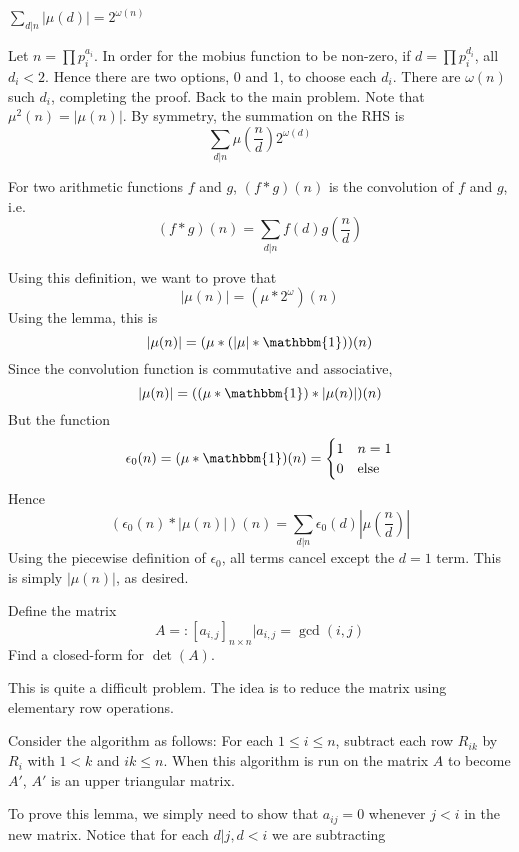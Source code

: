 \documentclass[11pt]{scrartcl}
\begin{document}
\begin{soln}
  \begin{lemma}
    $\sum_{d|n}|\mu(d)|=2^{\omega(n)}$
  \end{lemma}
    Let $n=\prod p_i^{a_i}$. In order for the mobius function to be
    non-zero, if $d=\prod p_i^{d_i}$, all $d_i<2$. Hence there are two options,
    0 and 1, to choose each $d_i$. There are $\omega(n)$ such $d_i$, completing
    the proof.
  \newline \newline
  Back to the main problem. Note that $\mu^2(n)=|\mu(n)|$.
  By symmetry, the summation on the RHS is
  $$\sum_{d|n}\mu\left(\frac{n}{d}\right)2^{\omega(d)}$$
  \begin{definition}
    For two arithmetic functions $f$ and $g$, $(f*g)(n)$ is the convolution
    of $f$ and $g$, i.e.
    $$(f*g)(n)=\sum_{d|n}f(d)g\left(\frac{n}{d}\right)$$
  \end{definition}
  \noindent Using this definition, we want to prove that
  $$|\mu(n)|=(\mu * 2^{\omega})(n)$$
  Using the lemma, this is
  $$|\mu(n)|=(\mu * (|\mu|*\mathbbm{1}))(n)$$
  Since the convolution function is commutative and associative,
  $$|\mu(n)|=((\mu*\mathbbm{1})*|\mu(n)|)(n)$$
  But the function
  $$\epsilon_0(n)=(\mu*\mathbbm{1})(n)=\begin{cases}1 & n=1 \\ 0 & \mathrm{else}\end{cases}$$
  Hence
  $$(\epsilon_0(n)*|\mu(n)|)(n)=\sum_{d|n}\epsilon_0(d)|\mu\left(\frac{n}{d}\right)|$$
  Using the piecewise definition of $\epsilon_0$, all terms cancel except the $d=1$ term.
  This is simply $|\mu(n)|$, as desired.
\end{soln}
\begin{example}
  Define the matrix
  $$A=:[a_{i,j}]_{n\times n}|a_{i,j}=\gcd(i,j)$$
  Find a closed-form for $\det(A)$.
\end{example}
 This is quite a difficult problem. The idea is to reduce the matrix using elementary row operations.
 \begin{lemma}
   Consider the algorithm as follows: For each $1\le i\le n$, subtract each row $R_{ik}$ by $R_i$ with $1<k$ and $ik\le n$.
   When this algorithm is run on the matrix $A$ to become $A'$, $A'$ is an upper triangular matrix.
 \end{lemma}
 To prove this lemma, we simply need to show that $a_{ij}=0$ whenever $j<i$ in the new matrix. Notice that for each $d|j, d<i$ we are subtracting
\end{document}
